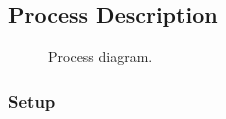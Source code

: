 \subsection{Process Description}
\label{sec:process}

\begin{figure}[h!]
    \centering
    \caption{Process diagram.}
    \label{fig:process}
\end{figure}

\clearpage

\subsubsection{Setup}
\label{sec:process_setup}


